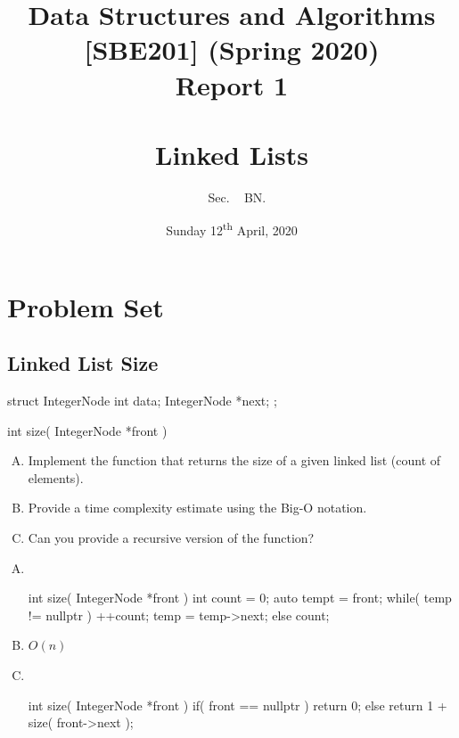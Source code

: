 \documentclass[usenames,dvipsnames]{article}
\author{\studentname ~ Sec. \SN ~ BN. \BN}
\date{Sunday 12\textsuperscript{th} April, 2020}
\title{Data Structures and Algorithms [SBE201] (Spring 2020)\\ Report 1\\~\\
{\small  Linked Lists }}
\begin{document}
\maketitle


\section{Problem Set}

\subsection{Linked List Size}




\cprotEnv \begin{question}
\begin{cppcode}
struct IntegerNode
{
  int data;
  IntegerNode *next;
};

int size( IntegerNode *front )
{

}
\end{cppcode}

\begin{enumerate}[A)]
\item Implement the function  that returns the size of a given linked list (count of elements).
\item Provide a time complexity estimate using the Big-O notation.
\item Can you provide a recursive version of the  function?
\end{enumerate}
\end{question}

\cprotEnv \begin{solution}

\begin{enumerate}[A)]
\item  \mbox{}\\

\begin{cppcode}
int size( IntegerNode *front )
{
  int count = 0;
  auto tempt = front;
  while( temp != nullptr ) 
  {
    ++count;
    temp = temp->next;
   }
  else count;
}
\end{cppcode}
\item $O(n)$
\item \mbox{}\\
\begin{cppcode}
int size( IntegerNode *front )
{
  if( front == nullptr ) return 0;
  else return 1 + size( front->next );
}
\end{cppcode}
\end{enumerate}


\end{solution}
\end{document}
